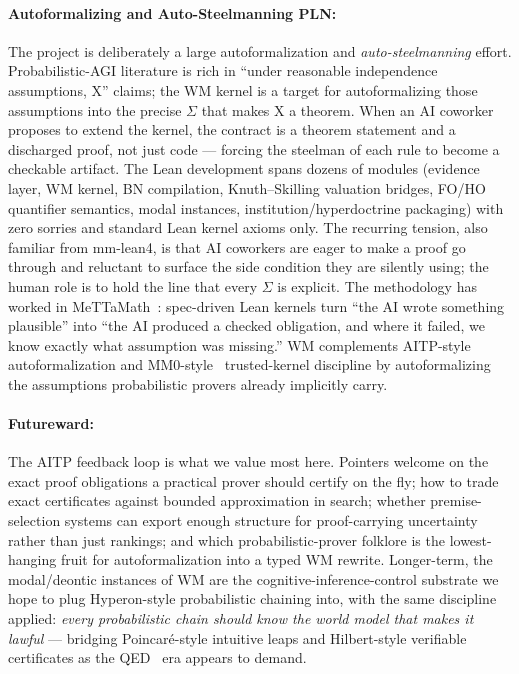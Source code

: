 \documentclass{easychair}
\newcommand{\side}{\Sigma}
\begin{document}
\paragraph*{Autoformalizing and Auto-Steelmanning PLN:}
The project is deliberately a large autoformalization and \emph{auto-steelmanning} effort.  Probabilistic-AGI literature is rich in ``under reasonable independence assumptions, X'' claims; the WM kernel is a target for autoformalizing those assumptions into the precise $\side$ that makes X a theorem.  When an AI coworker proposes to extend the kernel, the contract is a theorem statement and a discharged proof, not just code --- forcing the steelman of each rule to become a checkable artifact.  The Lean development spans dozens of modules (evidence layer, WM kernel, BN compilation, Knuth--Skilling valuation bridges, FO/HO quantifier semantics, modal instances, institution/hyperdoctrine packaging) with zero sorries and standard Lean kernel axioms only.  The recurring tension, also familiar from mm-lean4, is that AI coworkers are eager to make a proof go through and reluctant to surface the side condition they are silently using; the human role is to hold the line that every $\side$ is explicit.  The methodology has worked in MeTTaMath~\cite{goertzel2025mettamath}: spec-driven Lean kernels turn ``the AI wrote something plausible'' into ``the AI produced a checked obligation, and where it failed, we know exactly what assumption was missing.''  WM complements AITP-style autoformalization and MM0-style~\cite{metamath0tp} trusted-kernel discipline by autoformalizing the assumptions probabilistic provers already implicitly carry.

\vspace{-3mm}
\paragraph*{Futureward:}
The AITP feedback loop is what we value most here.  Pointers welcome on the exact proof obligations a practical prover should certify on the fly; how to trade exact certificates against bounded approximation in search; whether premise-selection systems can export enough structure for proof-carrying uncertainty rather than just rankings; and which probabilistic-prover folklore is the lowest-hanging fruit for autoformalization into a typed WM rewrite.  Longer-term, the modal/deontic instances of WM are the cognitive-inference-control substrate we hope to plug Hyperon-style probabilistic chaining into, with the same discipline applied: \emph{every probabilistic chain should know the world model that makes it lawful} --- bridging Poincar\'e-style intuitive leaps and Hilbert-style verifiable certificates as the QED~\cite{urban130, urbanisabelle} era appears to demand.
\end{document}
